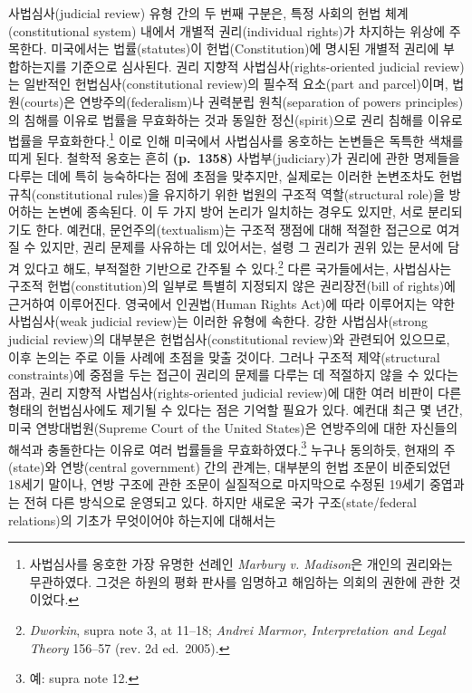 \documentclass[a4paper,12pt,oneside]{article}  %
\begin{document}
사법심사(judicial review) 유형 간의 두 번째 구분은, 특정 사회의 헌법
체계(constitutional system) 내에서 개별적 권리(individual rights)가
차지하는 위상에 주목한다. 미국에서는 법률(statutes)이
헌법(Constitution)에 명시된 개별적 권리에 부합하는지를 기준으로
심사된다. 권리 지향적 사법심사(rights-oriented judicial review)는
일반적인 헌법심사(constitutional review)의 필수적 요소(part and
parcel)이며, 법원(courts)은 연방주의(federalism)나 권력분립
원칙(separation of powers principles)의 침해를 이유로 법률을 무효화하는
것과 동일한 정신(spirit)으로 권리 침해를 이유로 법률을
무효화한다.\footnote{사법심사를 옹호한 가장 유명한 선례인 \emph{Marbury
  v. Madison}은 개인의 권리와는 무관하였다. 그것은 하원의 평화 판사를
  임명하고 해임하는 의회의 권한에 관한 것이었다.} 이로 인해 미국에서
사법심사를 옹호하는 논변들은 독특한 색채를 띠게 된다. 철학적 옹호는 흔히
\textbf{(p.~1358)} 사법부(judiciary)가 권리에 관한 명제들을 다루는 데에
특히 능숙하다는 점에 초점을 맞추지만, 실제로는 이러한 논변조차도 헌법
규칙(constitutional rules)을 유지하기 위한 법원의 구조적 역할(structural
role)을 방어하는 논변에 종속된다. 이 두 가지 방어 논리가 일치하는 경우도
있지만, 서로 분리되기도 한다. 예컨대, 문언주의(textualism)는 구조적
쟁점에 대해 적절한 접근으로 여겨질 수 있지만, 권리 문제를 사유하는 데
있어서는, 설령 그 권리가 권위 있는 문서에 담겨 있다고 해도, 부적절한
기반으로 간주될 수 있다.\footnote{\emph{Dworkin}, supra note 3, at
  11--18; \emph{Andrei Marmor, Interpretation and Legal Theory} 156--57
  (rev. 2d ed.~2005).} 다른 국가들에서는, 사법심사는 구조적
헌법(constitution)의 일부로 특별히 지정되지 않은 권리장전(bill of
rights)에 근거하여 이루어진다. 영국에서 인권법(Human Rights Act)에 따라
이루어지는 약한 사법심사(weak judicial review)는 이러한 유형에 속한다.
강한 사법심사(strong judicial review)의 대부분은 헌법심사(constitutional
review)와 관련되어 있으므로, 이후 논의는 주로 이들 사례에 초점을 맞출
것이다. 그러나 구조적 제약(structural constraints)에 중점을 두는 접근이
권리의 문제를 다루는 데 적절하지 않을 수 있다는 점과, 권리 지향적
사법심사(rights-oriented judicial review)에 대한 여러 비판이 다른 형태의
헌법심사에도 제기될 수 있다는 점은 기억할 필요가 있다. 예컨대 최근 몇
년간, 미국 연방대법원(Supreme Court of the United States)은 연방주의에
대한 자신들의 해석과 충돌한다는 이유로 여러 법률들을
무효화하였다.\footnote{예: supra note 12.} 누구나 동의하듯, 현재의
주(state)와 연방(central government) 간의 관계는, 대부분의 헌법 조문이
비준되었던 18세기 말이나, 연방 구조에 관한 조문이 실질적으로 마지막으로
수정된 19세기 중엽과는 전혀 다른 방식으로 운영되고 있다. 하지만 새로운
국가 구조(state/federal relations)의 기초가 무엇이어야 하는지에 대해서는
\end{document}
